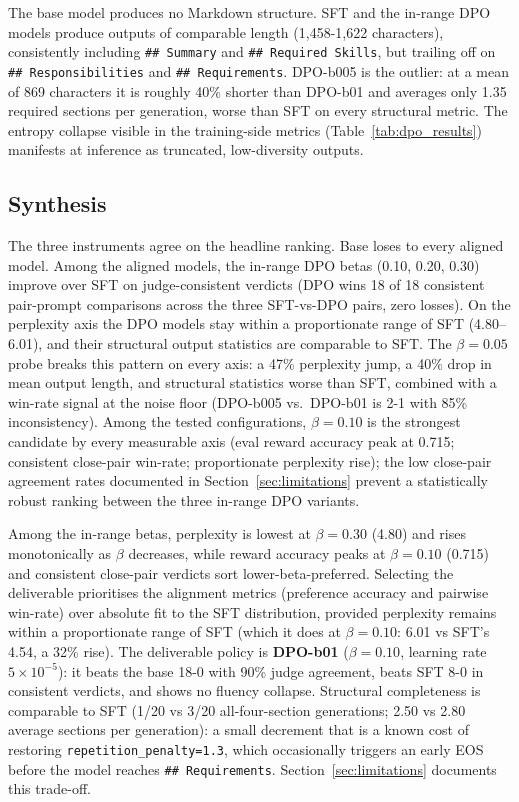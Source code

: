 \documentclass[../main.tex]{subfiles}
\begin{document}
The base model produces no Markdown structure. SFT and the in-range DPO models produce outputs of comparable length (1{,}458-1{,}622 characters), consistently including \texttt{\#\# Summary} and \texttt{\#\# Required Skills}, but trailing off on \texttt{\#\# Responsibilities} and \texttt{\#\# Requirements}. DPO-b005 is the outlier: at a mean of 869 characters it is roughly 40\% shorter than DPO-b01 and averages only 1.35 required sections per generation, worse than SFT on every structural metric. The entropy collapse visible in the training-side metrics (Table~\ref{tab:dpo_results}) manifests at inference as truncated, low-diversity outputs.

\subsection{Synthesis}
\label{sec:eval_synthesis}

The three instruments agree on the headline ranking. Base loses to every aligned model. Among the aligned models, the in-range DPO betas (0.10, 0.20, 0.30) improve over SFT on judge-consistent verdicts (DPO wins 18 of 18 consistent pair-prompt comparisons across the three SFT-vs-DPO pairs, zero losses). On the perplexity axis the DPO models stay within a proportionate range of SFT (4.80--6.01), and their structural output statistics are comparable to SFT. The $\beta = 0.05$ probe breaks this pattern on every axis: a 47\% perplexity jump, a 40\% drop in mean output length, and structural statistics worse than SFT, combined with a win-rate signal at the noise floor (DPO-b005 vs.\ DPO-b01 is 2-1 with 85\% inconsistency). Among the tested configurations, $\beta = 0.10$ is the strongest candidate by every measurable axis (eval reward accuracy peak at 0.715; consistent close-pair win-rate; proportionate perplexity rise); the low close-pair agreement rates documented in Section~\ref{sec:limitations} prevent a statistically robust ranking between the three in-range DPO variants.

Among the in-range betas, perplexity is lowest at $\beta = 0.30$ (4.80) and rises monotonically as $\beta$ decreases, while reward accuracy peaks at $\beta = 0.10$ (0.715) and consistent close-pair verdicts sort lower-beta-preferred. Selecting the deliverable prioritises the alignment metrics (preference accuracy and pairwise win-rate) over absolute fit to the SFT distribution, provided perplexity remains within a proportionate range of SFT (which it does at $\beta = 0.10$: 6.01 vs SFT's 4.54, a 32\% rise). The deliverable policy is \textbf{DPO-b01} ($\beta = 0.10$, learning rate $5 \times 10^{-5}$): it beats the base 18-0 with 90\% judge agreement, beats SFT 8-0 in consistent verdicts, and shows no fluency collapse. Structural completeness is comparable to SFT (1/20 vs 3/20 all-four-section generations; 2.50 vs 2.80 average sections per generation): a small decrement that is a known cost of restoring \texttt{repetition\_penalty=1.3}, which occasionally triggers an early EOS before the model reaches \texttt{\#\# Requirements}. Section~\ref{sec:limitations} documents this trade-off.
\end{document}
